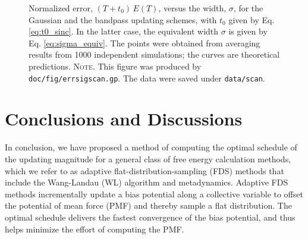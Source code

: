 \documentclass[reprint, superscriptaddress, floatfix]{revtex4-1}
\newcommand{\note}[1]{{\color{DarkGreen}\footnotesize \textsc{Note.} #1}}
\newcommand{\Err}{E}
\begin{document}
\begin{figure}[h]
\begin{center}
  \caption{
    \label{fig:errsigscan}
    Normalized error, $(T + t_0) \, \Err(T)$,
    versus the width, $\sigma$,
    for the Gaussian
    and the bandpass updating schemes,
    with $t_0$ given by Eq. \eqref{eq:t0_sinc}.
    In the latter case,
    the equivalent width
    $\sigma$ is given by Eq. \eqref{eq:sigma_equiv}.
    The points were obtained from averaging results
    from 1000 independent simulations;
    the curves are theoretical predictions.
    \note{This figure was produced by
      \texttt{doc/fig/errsigscan.gp}.
      The data were saved under
      \texttt{data/scan}.
    }%
  }
\end{center}
\end{figure}





\section{\label{sec:conclusion}
Conclusions and Discussions}



In conclusion,
we have proposed a method of computing
the optimal schedule of the updating magnitude
for a general class of free energy calculation methods,
which we refer to as adaptive flat-distribution-sampling (FDS) methods
that include the Wang-Landau (WL) algorithm and metadynamics.
%
Adaptive FDS methods
incrementally update a bias potential
along a collective variable
to offset the potential of mean force (PMF)
and thereby sample a flat distribution.
%
The optimal schedule delivers the fastest convergence
of the bias potential,
and thus helps minimize the effort
of computing the PMF.
\end{document}
